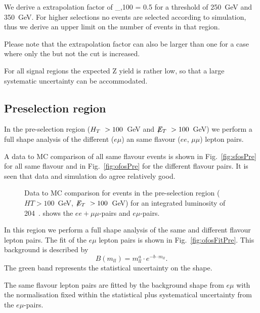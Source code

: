 We derive a extrapolation factor of
\be
    \epsilon_{\MET,100 } = 0.5 
\ee
for a \HT threshold of 250~GeV and 350~GeV.
For higher \MET selections no events are
selected according to simulation, 
thus we derive an upper limit on the number 
of events in that region.

Please note that the extrapolation factor can also be
larger than one for a case where only
the \HT but not the \MET cut is
increased.

For all signal regions the expected Z yield
is rather low, so that a large systematic uncertainty
can be accommodated.

\subsection{Preselection region}

In the pre-selection region ($H_T~>100$~GeV and $\displaystyle{\not} E_T~ > 100$~GeV)
we perform a full shape analysis of the different ($e\mu$) an same flavour ($ee$, $\mu\mu$)
lepton pairs.

A data to MC comparison of all same flavour events
is shown in Fig.~\ref{fig:sfosPre} for all same flavour
and in Fig.~\ref{fig:ofosPre} for the different flavour
pairs. It is seen that data and simulation do agree relatively good.

\begin{figure}[hbtp]
  \hfill
  \hfill
  \caption{Data to MC comparison for events in the pre-selection region ($HT>100$~GeV, $\displaystyle{\not} E_T~> 100$~GeV)
  for an integrated luminosity of 204~\pbi.  shows the $ee+\mu\mu$-pairs and
  $e\mu$-pairs.}
\end{figure}

In this region we perform a full shape analysis
of the same and different flavour lepton pairs.
The fit of the $e\mu$ lepton pairs is shown
in Fig.~\ref{fig:ofosFitPre}.
This background is described by 
\begin{equation}\label{eq:fit_bkg}
B(m_{ll}) = m_{ll}^{a} \cdot e^{-b\cdot m_{ll}}.
\end{equation}
The green band represents the statistical 
uncertainty on the shape.

The same flavour lepton pairs are fitted
by the background shape from $e\mu$
with the normalisation fixed within the 
statistical plus systematical uncertainty
from the $e\mu$-pairs.

